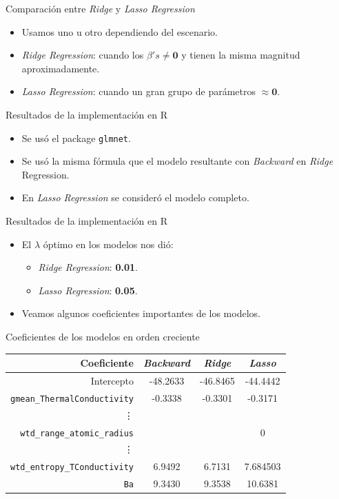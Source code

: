 \documentclass[11pt]{beamer}
\newcommand{\B}{\beta}
\newcommand{\cod}[1]{\texttt{\frenchspacing#1}}
\begin{document}
\begin{frame}{Comparación entre \textit{Ridge} y \textit{Lasso Regression}}
	\begin{itemize}
		\item Usamos uno u otro dependiendo del escenario.
		\pause
		\item \textit{Ridge Regression}: cuando los $\B's \not = \mathbf{0}$ y tienen la misma magnitud aproximadamente.
		\pause
		\item \textit{Lasso Regression}: cuando un gran grupo de parámetros $\approx \mathbf{0}$.
	\end{itemize}
\end{frame}

\begin{frame}{Resultados de la implementación en R}
	\begin{itemize}
		\item Se usó el package \cod{glmnet}.
		\pause
		\item Se usó la misma fórmula que el modelo resultante con \textit{Backward} en \textit{Ridge} Regression.
		\pause
		\item En \textit{Lasso Regression} se consideró el modelo completo.
	\end{itemize}
\end{frame}

\begin{frame}{Resultados de la implementación en R}
	\begin{itemize}
		\item El $\lambda$ óptimo en los modelos nos dió:
		\pause
		\begin{itemize}
			\item \textit{Ridge Regression}: \textbf{0.01}.
			\item \textit{Lasso Regression}: \textbf{0.05}.
		\end{itemize}
		\pause
		\item Veamos algunos coeficientes importantes de los modelos.
	\end{itemize}
\end{frame}


\begin{frame}{Coeficientes de los modelos en orden creciente}
	\begin{center}
		\begin{tabular}{|r|c|c|c|}
			\hline
			Coeficiente & \textit{Backward}& \textit{Ridge} & \textit{Lasso} \\
			\hline 
			Intercepto  &-48.2633 &-46.8465 &-44.4442 \\
			\cod{gmean\_ThermalConductivity} & -0.3338 & -0.3301 & -0.3171 \\
			\vdots & & & \\
			\cod{wtd\_range\_atomic\_radius} &  &  & 0\\
			\vdots & & & \\
			\cod{wtd\_entropy\_TConductivity}& 6.9492 & 6.7131 & 7.684503 \\
			\cod{Ba} & 9.3430 & 9.3538 & 10.6381 \\
			\hline
		\end{tabular}
	\end{center}
\end{frame}
\end{document}
